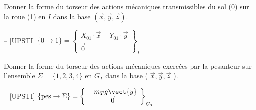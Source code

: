 \begin{question}Donner la forme du torseur des actions mécaniques transmissibles du sol (0) sur la roue (1) en \(I\) dans la base \((\vec{x}, \vec{y}, \vec{z})\).
\end{question}
\ifprof
\begin{corrige}-- [UPSTI]
$\{0 \rightarrow 1\}=\left\{\begin{array}{c}
X_{01} \cdot \vec{x}+Y_{01} \cdot \vec{y} \\
\vec{0}
\end{array}\right\}_{I}
$
\end{corrige}
\else
\fi

\begin{question}Donner la forme du torseur des actions mécaniques exercées par la pesanteur sur l'ensemble \(\Sigma=\{1,2,3,4\}\) en \(G_{T}\) dans la base ( \(\vec{x}, \vec{y}, \vec{z}\) ).
\end{question}
\ifprof
\begin{corrige}-- [UPSTI]
$\{\text{pes} \rightarrow \Sigma \}=\left\{\begin{array}{c}
-m_T g\vect{y}  \\
\vec{0}
\end{array}\right\}_{G_T}
$

\end{corrige}
\else
\fi

